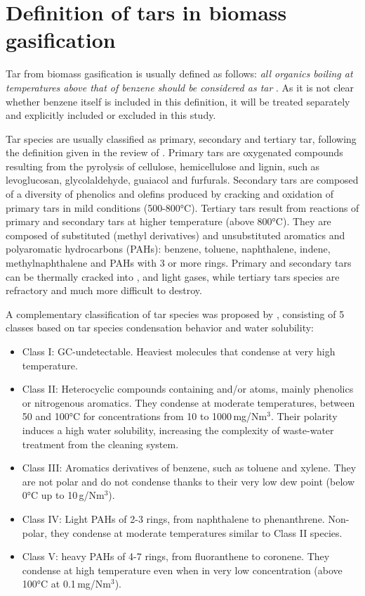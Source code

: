 
\section{Definition of tars in biomass gasification}
\label{sec:theo_tar}

Tar from biomass gasification is usually defined as follows: \textit{all organics boiling at temperatures above that of benzene should be considered as tar} \cite{Milne1998}. As it is not clear whether benzene itself is included in this definition, it will be treated separately and explicitly included or excluded in this study.

Tar species are usually classified as primary, secondary and tertiary tar, following the definition given in the review of \citet{Milne1998}. Primary tars are oxygenated compounds resulting from the pyrolysis of cellulose, hemicellulose and lignin, such as levoglucosan, glycolaldehyde, guaiacol and furfurals. Secondary tars are composed of a diversity of phenolics and olefins produced by cracking and oxidation of primary tars in mild conditions (500-800°C). Tertiary tars result from reactions of primary and secondary tars at higher temperature (above 800°C). They are composed of substituted (methyl derivatives) and unsubstituted aromatics and polyaromatic hydrocarbons (PAHs): benzene, toluene, naphthalene, indene, methylnaphthalene and PAHs with 3 or more rings. Primary and secondary tars can be thermally cracked into ,  and light gases, while tertiary tars species are refractory and much more difficult to destroy.

A complementary classification of tar species was proposed by \citet{Kiel2004}, consisting of 5 classes based on tar species condensation behavior and water solubility:
\begin{itemize}
\item Class I: GC-undetectable. Heaviest molecules that condense at very high temperature.
\item Class II: Heterocyclic compounds containing  and/or  atoms, mainly phenolics or nitrogenous aromatics. They condense at moderate temperatures, between 50 and 100°C for concentrations from 10 to 1000\,mg/Nm$^3$. Their polarity induces a high water solubility, increasing the complexity of waste-water treatment from the cleaning system.
\item Class III: Aromatics derivatives of benzene, such as toluene and xylene. They are not polar and do not condense thanks to their very low dew point (below 0°C up to 10\,g/Nm$^3$).
\item Class IV: Light PAHs of 2-3 rings, from naphthalene to phenanthrene. Non-polar, they condense at moderate temperatures similar to Class II species.
\item Class V: heavy PAHs of 4-7 rings, from fluoranthene to coronene. They condense at high temperature even when in very low concentration (above 100°C at 0.1\,mg/Nm$^3$).
\end{itemize}

